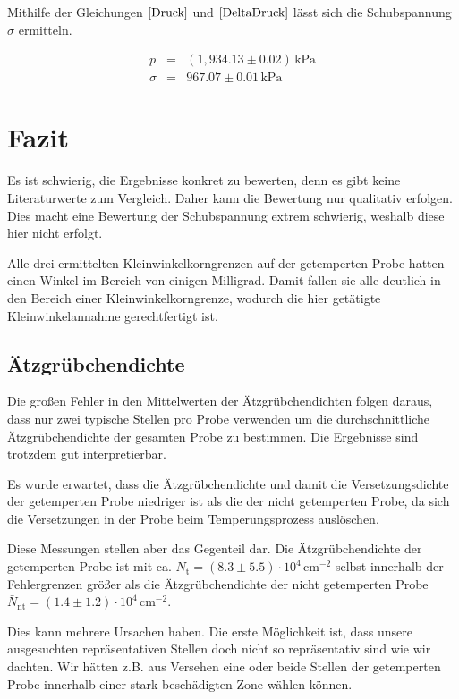 \documentclass[12pt,a4paper]{scrartcl}
\numberwithin{equation}{section} %
\renewcommand{\[}{} %
\renewcommand{\]}{\noindent} %
\begin{document}
Mithilfe der Gleichungen \(\eqref{Druck}\) und \(\eqref{DeltaDruck}\)
lässt sich die Schubspannung \(\sigma\) ermitteln.

\[
\begin{eqnarray}
    p &=& (1,934.13 \pm 0.02) \mathrm{\,kPa} \\
    \sigma &=& 967.07 \pm 0.01 \mathrm{\,kPa}
\end{eqnarray}
\]

\hypertarget{fazit}{%
\section{Fazit}\label{fazit}}

Es ist schwierig, die Ergebnisse konkret zu bewerten, denn es gibt keine
Literaturwerte zum Vergleich. Daher kann die Bewertung nur qualitativ
erfolgen. Dies macht eine Bewertung der Schubspannung extrem schwierig,
weshalb diese hier nicht erfolgt.

Alle drei ermittelten Kleinwinkelkorngrenzen auf der getemperten Probe
hatten einen Winkel im Bereich von einigen Milligrad. Damit fallen sie
alle deutlich in den Bereich einer Kleinwinkelkorngrenze, wodurch die
hier getätigte Kleinwinkelannahme gerechtfertigt ist.

\hypertarget{uxe4tzgruxfcbchendichte-1}{%
\subsection{Ätzgrübchendichte}\label{uxe4tzgruxfcbchendichte-1}}

Die großen Fehler in den Mittelwerten der Ätzgrübchendichten folgen
daraus, dass nur zwei typische Stellen pro Probe verwenden um die
durchschnittliche Ätzgrübchendichte der gesamten Probe zu bestimmen. Die
Ergebnisse sind trotzdem gut interpretierbar.

Es wurde erwartet, dass die Ätzgrübchendichte und damit die
Versetzungsdichte der getemperten Probe niedriger ist als die der nicht
getemperten Probe, da sich die Versetzungen in der Probe beim
Temperungsprozess auslöschen. \cite{Newey}

Diese Messungen stellen aber das Gegenteil dar. Die Ätzgrübchendichte
der getemperten Probe ist mit ca.
\(\bar N_\mathrm{t}=(8.3\pm 5.5) \cdot 10^4 \mathrm{\, cm^{-2}}\) selbst
innerhalb der Fehlergrenzen größer als die Ätzgrübchendichte der nicht
getemperten Probe
\(\bar N_\mathrm{nt}=(1.4 \pm 1.2) \cdot 10^4 \mathrm{\, cm^{-2}}\).

Dies kann mehrere Ursachen haben. Die erste Möglichkeit ist, dass unsere
ausgesuchten repräsentativen Stellen doch nicht so repräsentativ sind
wie wir dachten. Wir hätten z.B. aus Versehen eine oder beide Stellen
der getemperten Probe innerhalb einer stark beschädigten Zone wählen
können.
\end{document}
